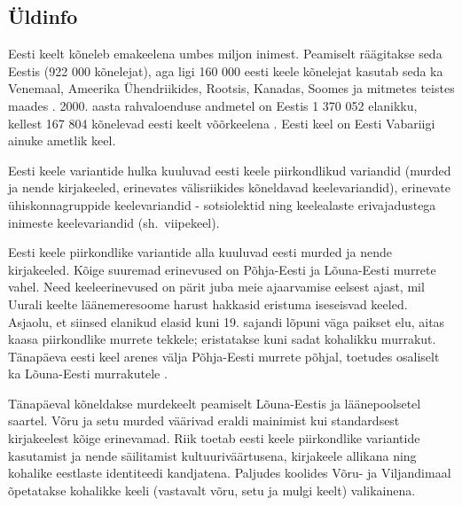 \clearpage



\begin{multicols}{2}

\subsection{Üldinfo}

Eesti keelt kõneleb emakeelena umbes miljon inimest.  Peamiselt räägitakse seda Eestis (922 000 kõnelejat), aga ligi 160 000 eesti keele kõnelejat kasutab seda ka Vene\-maal, Ameerika Ühendriikides, Rootsis, Kanadas, Soomes ja mitmetes teistes maades \cite{Stat1}.  2000. aasta rahvaloenduse andmetel on Eestis 1 370 052 elanikku, kellest 167 804 kõnelevad eesti keelt võõrkeelena \cite{Stat2}.  Eesti keel on Eesti Vabariigi ainuke ametlik keel.
 

Eesti keele variantide hulka kuuluvad eesti keele piirkondlikud variandid (murded ja nende kirjakeeled, erinevates välis\-riikides kõneldavad keelevariandid), erinevate ühiskonnagruppide keelevariandid - sotsiolektid ning keelealaste erivajadustega inimeste keelevariandid (sh.~viipekeel).

Eesti keele piirkondlike variantide alla kuuluvad eesti murded ja nende kirjakeeled.  Kõige suuremad erinevused on Põhja-Eesti ja Lõuna-Eesti murrete vahel.  Need keeleerinevused on pärit juba meie ajaarvamise eelsest ajast, mil Uurali keelte läänemeresoome harust hakkasid eristuma iseseisvad keeled.  Asja\-olu, et siinsed elanikud elasid kuni 19. sajandi lõpuni väga paikset elu, aitas kaasa piirkondlike murrete tekkele; eristatakse kuni sadat kohalikku murrakut.  Tänapäeva eesti keel arenes välja Põhja-Eesti murrete põhjal, toetudes osaliselt ka Lõuna-Eesti murrakutele \cite{KeeleStratEst}.

Tänapäeval kõneldakse murdekeelt peamiselt Lõuna-Eestis ja läänepoolsetel saartel.  Võru ja setu murded väärivad eraldi mainimist kui standardsest kirjakeelest kõige eri\-nevamad.  Riik toetab eesti keele piirkondlike variantide kasutamist ja nende säilitamist kultuuriväärtusena, kirjakeele allikana ning kohalike eestlaste identiteedi kandjatena.  Paljudes koolides Võru- ja Viljandimaal õpetatakse kohalikke keeli (vastavalt võru, setu ja mulgi keelt) valikainena.


\end{multicols}
